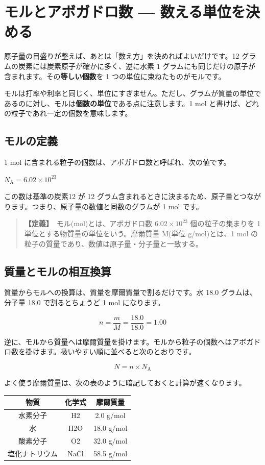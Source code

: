 \documentclass{article}
\begin{document}
\section{モルとアボガドロ数 — 数える単位を決める}

原子量の目盛りが整えば、あとは「数え方」を決めればよいだけです。12 グラムの炭素には炭素原子が確かに多く、逆に水素 1 グラムにも同じだけの原子が含まれます。その\textbf{等しい個数}を 1 つの単位に束ねたものがモルです。

モルは打率や利率と同じく、単位にすぎません。ただし、グラムが質量の単位であるのに対し、モルは\textbf{個数の単位}である点に注意します。1 mol と書けば、どれの粒子であれ一定の個数を意味します。

\subsection{モルの定義}

1 mol に含まれる粒子の個数は、アボガドロ数と呼ばれ、次の値です。

\( N_{\mathrm{A}} = 6.02 \times 10^{23} \)

この数は基準の炭素12 が 12 グラム含まれるときに決まるため、原子量とつながります。つまり、原子量の数値と同数のグラムが 1 mol です。

\begin{quote}
\textbf{【定義】}\ モル(mol)とは、アボガドロ数 \( 6.02 \times 10^{23} \) 個の粒子の集まりを 1 単位とする物質量の単位をいう。摩爾質量 M(単位 g/mol)とは、1 mol の粒子の質量であり、数値は原子量・分子量と一致する。
\end{quote}

\subsection{質量とモルの相互換算}

質量からモルへの換算は、質量を摩爾質量で割るだけです。水 18.0 グラムは、分子量 18.0 で割るとちょうど 1 mol になります。

\[ n = \frac{m}{M} = \frac{18.0}{18.0} = 1.00 \]

逆に、モルから質量へは摩爾質量を掛けます。モルから粒子の個数へはアボガドロ数を掛けます。扱いやすい順に並べると次のとおりです。

\[ N = n \times N_{\mathrm{A}} \]

よく使う摩爾質量は、次の表のように暗記しておくと計算が速くなります。

\begin{center}
\begin{tabular}{|c|c|c|}
\hline
物質 & 化学式 & 摩爾質量 \\
\hline
水素分子 & H2 & 2.0 g/mol \\
水 & H2O & 18.0 g/mol \\
酸素分子 & O2 & 32.0 g/mol \\
塩化ナトリウム & NaCl & 58.5 g/mol \\
\hline
\end{tabular}
\end{center}
\end{document}
